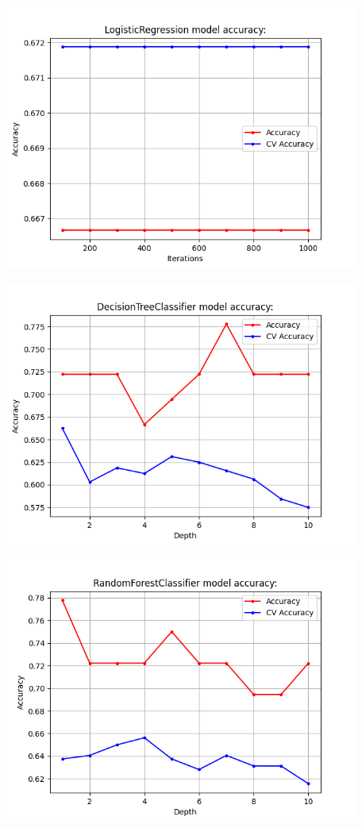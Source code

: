 \documentclass[11pt, a4paper, notitlepage]{report}
\begin{document}
\begin{center}

\includegraphics[width=330pt]{graphics/LogisticRegression_2}

\includegraphics[width=330pt]{graphics/DecisionTreeClassifier_2}

\includegraphics[width=330pt]{graphics/RandomForestClassifier_2}


\end{center}
\end{document}
